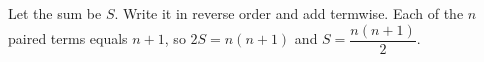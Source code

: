 Let the sum be $S$. Write it in reverse order and add termwise. Each of the $n$ paired terms equals $n+1$, so $2S=n(n+1)$ and $\boxed{S=\dfrac{n(n+1)}{2}}$.
